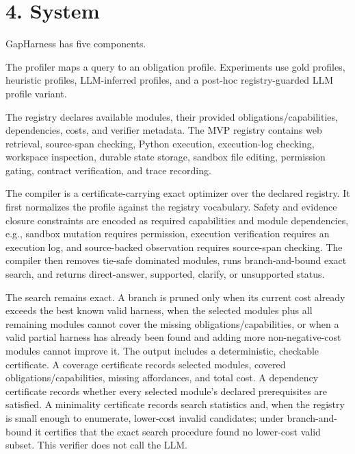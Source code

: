 \documentclass[
  10pt,
]{article}
\begin{document}
\section{4. System}\label{system}

GapHarness has five components.

The profiler maps a query to an obligation profile. Experiments use gold
profiles, heuristic profiles, LLM-inferred profiles, and a post-hoc
registry-guarded LLM profile variant.

The registry declares available modules, their provided
obligations/capabilities, dependencies, costs, and verifier metadata.
The MVP registry contains web retrieval, source-span checking, Python
execution, execution-log checking, workspace inspection, durable state
storage, sandbox file editing, permission gating, contract verification,
and trace recording.

The compiler is a certificate-carrying exact optimizer over the declared
registry. It first normalizes the profile against the registry
vocabulary. Safety and evidence closure constraints are encoded as
required capabilities and module dependencies, e.g., sandbox mutation
requires permission, execution verification requires an execution log,
and source-backed observation requires source-span checking. The
compiler then removes tie-safe dominated modules, runs branch-and-bound
exact search, and returns direct-answer, supported, clarify, or
unsupported status.

The search remains exact. A branch is pruned only when its current cost
already exceeds the best known valid harness, when the selected modules
plus all remaining modules cannot cover the missing
obligations/capabilities, or when a valid partial harness has already
been found and adding more non-negative-cost modules cannot improve it.
The output includes a deterministic, checkable certificate. A coverage
certificate records selected modules, covered obligations/capabilities,
missing affordances, and total cost. A dependency certificate records
whether every selected module's declared prerequisites are satisfied. A
minimality certificate records search statistics and, when the registry
is small enough to enumerate, lower-cost invalid candidates; under
branch-and-bound it certifies that the exact search procedure found no
lower-cost valid subset. This verifier does not call the LLM.
\end{document}
